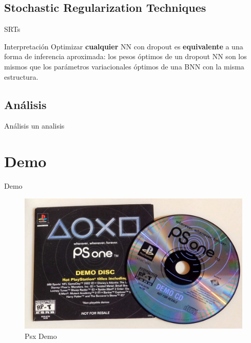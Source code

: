 \subsection{Stochastic Regularization Techniques}

\begin{frame}{SRTs}
     \begin{block}{Interpretación}
        Optimizar \textbf{cualquier} NN con dropout es \textbf{equivalente} a una forma de inferencia aproximada: los pesos óptimos de un dropout NN son los mismos que los parámetros variacionales óptimos de una BNN con la misma estructura.
    \end{block}
\end{frame}


\subsection{Análisis}

\begin{frame}{Análisis}
    un analisis
\end{frame}




\section{Demo}

\begin{frame}{Demo}
    \begin{figure}[H]
        \centering
        \includegraphics[scale=0.2]{presentaciones/img/demopsx.jpg}
        \caption{Psx Demo}
        \label{psx}
    \end{figure}
\end{frame}

